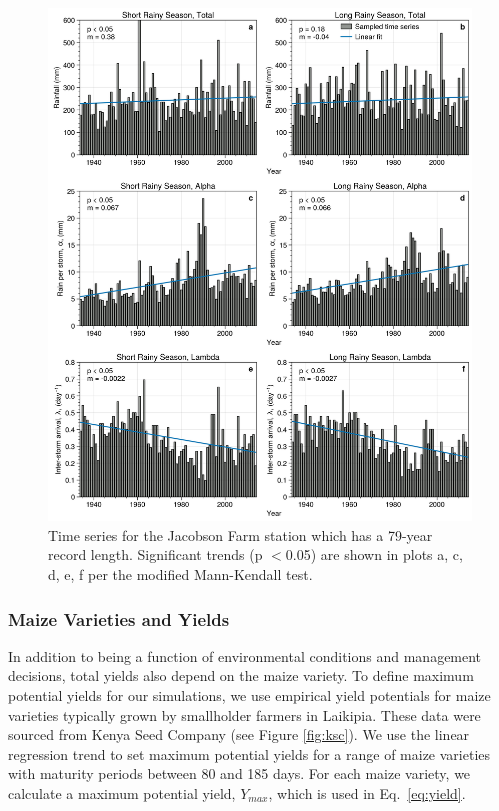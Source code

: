 \begin{figure}%
\centering
\includegraphics[width=155mm]{jacobson_ts.png}
\caption{Time series for the Jacobson Farm station which has a 79-year record length. Significant trends (p $<$0.05) are shown in plots a, c, d, e, f per the modified Mann-Kendall test.}
\label{fig:jacobson}
\end{figure}

\subsubsection{Maize Varieties and Yields}

In addition to being a function of environmental conditions and management decisions, total yields also depend on the maize variety. To define maximum potential yields for our simulations, we use empirical yield potentials for maize varieties typically grown by smallholder farmers in Laikipia. These data were sourced from Kenya Seed Company (see Figure \ref{fig:ksc}). We use the linear regression trend to set maximum potential yields for a range of maize varieties with maturity periods between 80 and 185 days. For each maize variety, we calculate a maximum potential yield, $Y_{max}$, which is used in Eq.~\ref{eq:yield}.

